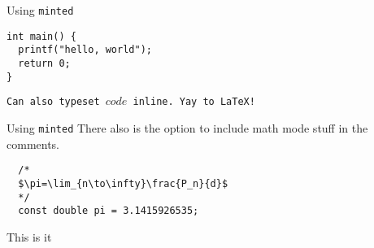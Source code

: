 \begin{frame}[fragile]{Using \texttt{minted}}
\begin{verbatim}
int main() {
  printf("hello, world");
  return 0;
}
\end{verbatim}
\texttt{Can also typeset $code$ inline. Yay to \LaTeX{}!}
\end{frame}

\begin{frame}[fragile]{Using \texttt{minted}}
There also is the option to include math mode stuff in the comments.
\begin{verbatim}
  /*
  $\pi=\lim_{n\to\infty}\frac{P_n}{d}$ 
  */
  const double pi = 3.1415926535;
\end{verbatim}
\end{frame}


\begin{frame}[standout]
    This is it ~\alert{\faSmileO}~
\end{frame}
